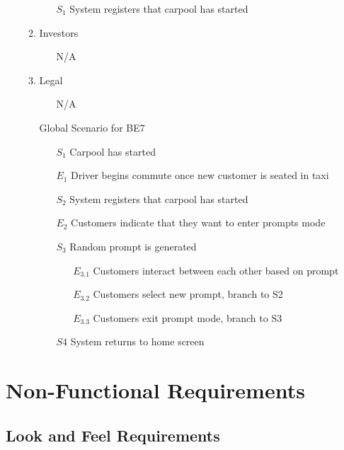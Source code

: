\documentclass[]{article}
\begin{document}
\begin{enumerate}[{\textbf{BE}}1.]
\begin{enumerate}[{VP7}.1]
\begin{enumerate}
                \item[$S_1$] System registers that carpool has started
            \end{enumerate}
        \item Investors
            \begin{enumerate}
                \item[N/A]
            \end{enumerate}
        \item Legal
            \begin{enumerate}
                \item[N/A]
            \end{enumerate}
        \item[Global] Scenario for BE7
            \begin{enumerate}
                \item[$S_1$] Carpool has started
                \item[$E_1$] Driver begins commute once new customer is seated in taxi
                \item[$S_2$] System registers that carpool has started
                \item[$E_2$] Customers indicate that they want to enter prompts mode
                \item[$S_3$] Random prompt is generated
                \begin{enumerate}
                    \item[$E_{3.1}$] Customers interact between each other based on prompt
                    \item[$E_{3.2}$] Customers select new prompt, branch to S2
                    \item[$E_{3.3}$] Customers exit prompt mode, branch to S3
                \end{enumerate}
                \item[$S4$] System returns to home screen
            \end{enumerate}
    \end{enumerate}
\end{enumerate}

\section{Non-Functional Requirements}
\label{sec:non-functional_requirements}

\subsection{Look and Feel Requirements}
\label{sub:look_and_feel_requirements}
\end{document}
